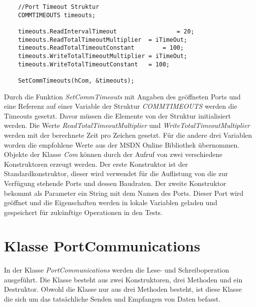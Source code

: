 \begin{lstlisting}
	//Port Timeout Struktur
	COMMTIMEOUTS timeouts;
	
	timeouts.ReadIntervalTimeout				 = 20;
	timeouts.ReadTotalTimeoutMultiplier	 = iTimeOut;
	timeouts.ReadTotalTimeoutConstant		 = 100;
	timeouts.WriteTotalTimeoutMultiplier = iTimeOut;
	timeouts.WriteTotalTimeoutConstant	 = 100;
	
	SetCommTimeouts(hCom, &timeouts);
\end{lstlisting}

Durch die Funktion \textit{SetCommTimeouts} mit Angaben des geöffneten Ports und eine Referenz auf einer Variable der Struktur \textit{COMMTIMEOUTS} werden die Timeouts gesetzt. Davor müssen die Elemente von der Struktur initialisiert werden. Die Werte \textit{ReadTotalTimeoutMultiplier} und \textit{WriteTotalTimeoutMultiplier} werden mit der berechnete Zeit pro Zeichen gesetzt. Für die andere drei Variablen worden die empfohlene Werte aus der MSDN Online Bibliothek\cite{SerialCommunications} übernommen. \\

Objekte der Klasse \textit{Com} können durch der Aufruf von zwei verschiedene Konstruktoren erzeugt werden. Der erste Konstruktor ist der Standardkonstruktor, dieser wird verwendet für die Auflistung von die zur Verfügung stehende Ports und dessen Baudraten. Der zweite Konstruktor bekommt als Parameter ein String mit dem Namen des Ports. Dieser Port wird geöffnet und die Eigenschaften werden in lokale Variablen geladen und gespeichert für zukünftige Operationen in den Tests.
 
\newpage


\section{Klasse PortCommunications}\label{PortCommClass}
\paragraph{}
In der Klasse \textit{PortCommunications} werden die Lese- und Schreiboperation ausgeführt. Die Klasse besteht aus zwei Konstruktoren, drei Methoden und ein Destruktor. Obwohl die Klasse nur aus drei Methoden besteht, ist diese Klasse die sich um das tatsächliche Senden und Empfangen von Daten befasst.\\

